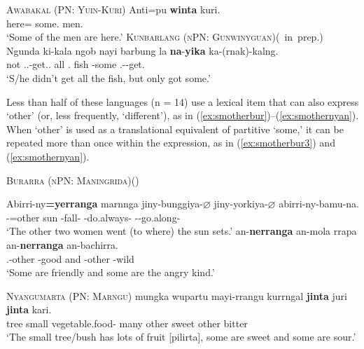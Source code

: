 \documentclass[12pt,egregdoesnotlikesansseriftitles]{scrartcl}
\begin{document}
\begin{exe}
  \ex\label{ex:specsmawa} \textsc{Awabakal (PN: Yuin-Kuri)}\hfill {}
  \gll Anti=pu \textbf{winta} kuri.\\
  here=\Excl{} some.\Abs{} men.\Abs\\
  \glt `Some of the men are here.' %
  \ex\label{ex:specsmwlg} \textsc{Kunbarlang (nPN: Gunwinyguan)}\hfill (\citeauthor{ikthesis}~in~prep.)
  \gll Ngunda ki-kala ngob nayi barbung la \textbf{na}-\textbf{yika} ka-(rnak)-kalng.\\
  not \Tsg.\Irr.\Pst-get.\Irr.\Pst{} all \Nm.\Cli{} fish \Conj{} \Cli-some \Tsg.\Nfut-\Lim-get.\Pst\\
  \glt `S/he didn't get all the fish, but only got some.' %
\end{exe}

Less than half of these languages (n = 14) use a lexical item that can also express `other' (or, less frequently, `different'),  as in (\ref{ex:smotherbur})--(\ref{ex:smothernyan}). When `other' is used as a translational equivalent of partitive `some,' it can be repeated more than once within the expression, as in (\ref{ex:smotherbur3}) and (\ref{ex:smothernyan}).
\begin{exe}
  \ex\label{ex:smotherbur} \textsc{Burarra (nPN: Maningrida)}\hfill (\citealt{green87})
  \begin{xlist}
    \ex \gll Abirri-ny\textbf{=yerranga} marnnga jiny-bunggiya-$\varnothing$ jiny-yorkiya-$\varnothing$  abirri-ny-bamu-na. \\
    \Third\Ua-\F=other sun \Third\Min-fall-\Ctp{} \Third\Min-do.always-\Ctp{} \Third\Ua-\F-go.along-\Pc\\
    \glt `The other two women went (to where) the sun sets.' \label{ex:smotherbur2}
    \ex \gll an-\textbf{nerranga} an-mola  rrapa  an-\textbf{nerranga}  an-bachirra.\\
    \Third.\Min-other \Third\Min-good and \Third\Min-other \Third\Min-wild\\
    \glt `Some are friendly and some are the angry kind.' \label{ex:smotherbur3}
  \end{xlist}
  \ex\label{ex:smothernyan} \textsc{Nyangumarta (PN: Marngu)}\hfill {}
  \gll mungka wupartu mayi-rrangu kurrngal \textbf{jinta} juri \textbf{jinta} kari.\\
  tree  small vegetable.food-\Pl{} many other sweet other bitter\\
  \glt `The small tree/bush has lots of fruit [pilirta], some are sweet and some are sour.'
\end{exe}
\end{document}
